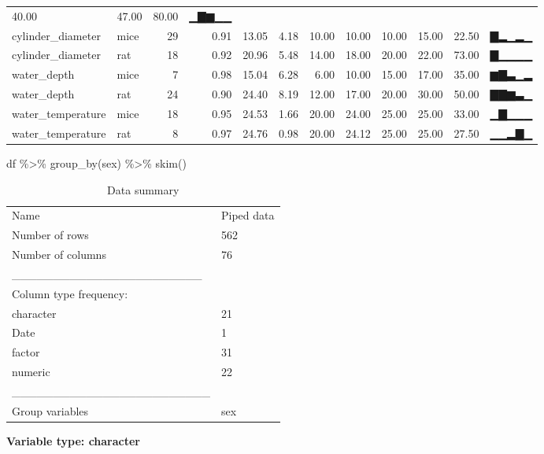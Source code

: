 \documentclass[
]{article}
\newenvironment{Shaded}{\begin{snugshade}}{\end{snugshade}}
\newcommand{\FunctionTok}[1]{\textcolor[rgb]{0.00,0.00,0.00}{#1}}
\newcommand{\NormalTok}[1]{#1}
\newcommand{\SpecialCharTok}[1]{\textcolor[rgb]{0.00,0.00,0.00}{#1}}
\begin{document}
\begin{longtable}[]{@{}llrrrrrrrrrl@{}}
40.00 & 47.00 & 80.00 & ▁▇▆▁▁ \\
cylinder\_diameter & mice & 29 & 0.91 & 13.05 & 4.18 & 10.00 & 10.00 &
10.00 & 15.00 & 22.50 & ▇▂▁▂▁ \\
cylinder\_diameter & rat & 18 & 0.92 & 20.96 & 5.48 & 14.00 & 18.00 &
20.00 & 22.00 & 73.00 & ▇▁▁▁▁ \\
water\_depth & mice & 7 & 0.98 & 15.04 & 6.28 & 6.00 & 10.00 & 15.00 &
17.00 & 35.00 & ▆▇▃▁▂ \\
water\_depth & rat & 24 & 0.90 & 24.40 & 8.19 & 12.00 & 17.00 & 20.00 &
30.00 & 50.00 & ▇▇▆▃▁ \\
water\_temperature & mice & 18 & 0.95 & 24.53 & 1.66 & 20.00 & 24.00 &
25.00 & 25.00 & 33.00 & ▁▇▁▁▁ \\
water\_temperature & rat & 8 & 0.97 & 24.76 & 0.98 & 20.00 & 24.12 &
25.00 & 25.00 & 27.50 & ▁▁▂▇▁ \\
\bottomrule
\end{longtable}

\begin{Shaded}
\begin{Highlighting}[]
\NormalTok{df }\SpecialCharTok{\%\textgreater{}\%} 
  \FunctionTok{group\_by}\NormalTok{(sex) }\SpecialCharTok{\%\textgreater{}\%} 
  \FunctionTok{skim}\NormalTok{()}
\end{Highlighting}
\end{Shaded}

\begin{longtable}[]{@{}ll@{}}
\caption{Data summary}\tabularnewline
\toprule
\endhead
Name & Piped data \\
Number of rows & 562 \\
Number of columns & 76 \\
\_\_\_\_\_\_\_\_\_\_\_\_\_\_\_\_\_\_\_\_\_\_\_ & \\
Column type frequency: & \\
character & 21 \\
Date & 1 \\
factor & 31 \\
numeric & 22 \\
\_\_\_\_\_\_\_\_\_\_\_\_\_\_\_\_\_\_\_\_\_\_\_\_ & \\
Group variables & sex \\
\bottomrule
\end{longtable}

\textbf{Variable type: character}
\end{document}
